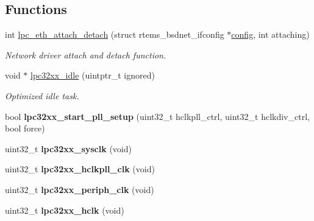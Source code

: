 \subsection*{Functions}
\begin{DoxyCompactItemize}
\item 
\mbox{\label{group__RTEMSBSPsARMLPC32XX_ga1ee87990424a1bed28cb5081a56043b2}} 
int \mbox{\hyperlink{group__RTEMSBSPsARMLPC32XX_ga1ee87990424a1bed28cb5081a56043b2}{lpc\+\_\+eth\+\_\+attach\+\_\+detach}} (struct rtems\+\_\+bsdnet\+\_\+ifconfig $\ast$\mbox{\hyperlink{structconfig__s}{config}}, int attaching)
\begin{DoxyCompactList}\small\item\em Network driver attach and detach function. \end{DoxyCompactList}\item 
void $\ast$ \mbox{\hyperlink{group__RTEMSBSPsARMLPC32XX_gae59fa9eb85e332e4e50b50ac63158410}{lpc32xx\+\_\+idle}} (uintptr\+\_\+t ignored)
\begin{DoxyCompactList}\small\item\em Optimized idle task. \end{DoxyCompactList}\item 
\mbox{\label{group__RTEMSBSPsARMLPC32XX_ga9e2726ba503a5ff72838c3eae18e37ad}} 
bool {\bfseries lpc32xx\+\_\+start\+\_\+pll\+\_\+setup} (uint32\+\_\+t hclkpll\+\_\+ctrl, uint32\+\_\+t hclkdiv\+\_\+ctrl, bool force)
\item 
\mbox{\label{group__RTEMSBSPsARMLPC32XX_gab8e4fe306b7e72be6bd3d30d82f87723}} 
uint32\+\_\+t {\bfseries lpc32xx\+\_\+sysclk} (void)
\item 
\mbox{\label{group__RTEMSBSPsARMLPC32XX_ga95a5a5aebf7625f14761770b2232038f}} 
uint32\+\_\+t {\bfseries lpc32xx\+\_\+hclkpll\+\_\+clk} (void)
\item 
\mbox{\label{group__RTEMSBSPsARMLPC32XX_ga3032c31136e3c2ad69c16a52a6305a58}} 
uint32\+\_\+t {\bfseries lpc32xx\+\_\+periph\+\_\+clk} (void)
\item 
\mbox{\label{group__RTEMSBSPsARMLPC32XX_gac5497ccc2c14f3d48aee42aa4f02a64b}} 
uint32\+\_\+t {\bfseries lpc32xx\+\_\+hclk} (void)

\end{DoxyCompactItemize}
